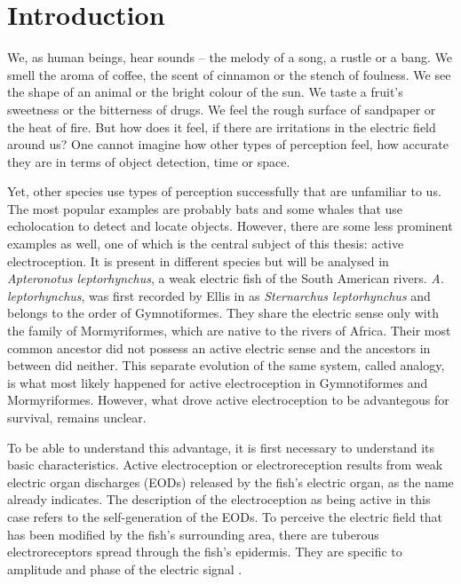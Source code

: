 
\chapter{Introduction} 
    \label{Introduction}
    
We, as human beings, hear sounds – the melody of a song, a rustle or a bang. We smell the aroma of coffee, the scent of cinnamon or the stench of foulness. We see the shape of an animal or the bright colour of the sun. We taste a fruit’s sweetness or the bitterness of drugs. We feel the rough surface of sandpaper or the heat of fire. But how does it feel, if there are irritations in the electric field around us? One cannot imagine how other types of perception feel, how accurate they are in terms of object detection, time or space. 

 Yet, other species use types of perception successfully that are unfamiliar to us. The most popular examples are probably bats and some whales that use echolocation to detect and locate objects. However, there are some less prominent examples as well, one of which is the central subject of this thesis: active electroception. It is present in different species but will be analysed in \textit{Apteronotus leptorhynchus}, a weak electric fish of the South American rivers. \textit{A. leptorhynchus}, was first recorded by Ellis in  as \textit{Sternarchus leptorhynchus} and belongs to the order of Gymnotiformes. They share the electric sense only with the family of Mormyriformes, which are native to the rivers of Africa. Their most common ancestor did not possess an active electric sense and  the ancestors in between did neither. This separate evolution of the same system, called analogy, is what most likely happened for active electroception in Gymnotiformes and Mormyriformes. However, what drove active electroception to be advantegous for survival, remains unclear.
 
 To be able to understand this advantage, it is first necessary to understand its basic characteristics. Active electroception or electroreception results from weak electric organ discharges (EODs) released by the fish's electric organ, as the name already indicates. The description of the electroception as being active in this case refers to the self-generation of the EODs. 
To perceive the electric field that has been modified by the fish's surrounding area, there are tuberous electroreceptors spread through the fish's epidermis. They are specific to amplitude and phase of the electric signal \cite{assad1997electric}.

